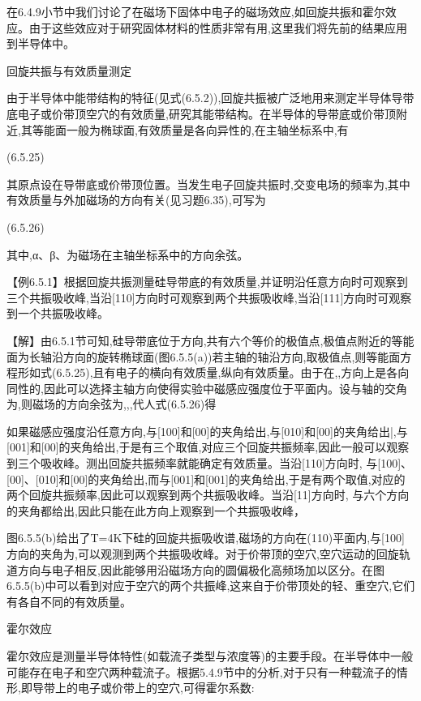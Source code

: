 在6.4.9小节中我们讨论了在磁场下固体中电子的磁场效应,如回旋共振和霍尔效应。由于这些效应对于研究固体材料的性质非常有用,这里我们将先前的结果应用到半导体中。

回旋共振与有效质量测定

由于半导体中能带结构的特征(见式(6.5.2)),回旋共振被广泛地用来测定半导体导带底电子或价带顶空穴的有效质量,研究其能带结构。在半导体的导带底或价带顶附近,其等能面一般为椭球面,有效质量是各向异性的,在主轴坐标系中,有

 	(6.5.25)

其原点设在导带底或价带顶位置。当发生电子回旋共振时,交变电场的频率为,其中有效质量与外加磁场的方向有关(见习题6.35),可写为

	 (6.5.26)

其中,α、β、为磁场在主轴坐标系中的方向余弦。

【例6.5.1】根据回旋共振测量硅导带底的有效质量,并证明沿任意方向时可观察到三个共振吸收峰,当沿[110]方向时可观察到两个共振吸收峰,当沿[111]方向时可观察到一个共振吸收峰。

【解】由6.5.1节可知,硅导带底位于方向,共有六个等价的极值点,极值点附近的等能面为长轴沿方向的旋转椭球面(图6.5.5(a))若主轴的轴沿方向,取极值点,则等能面方程形如式(6.5.25),且有电子的横向有效质量,纵向有效质量。由于在,,方向上是各向同性的,因此可以选择主轴方向使得实验中磁感应强度位于平面内。设与轴的交角为,则磁场的方向余弦为,,,代人式(6.5.26)得



如果磁感应强度沿任意方向,与[100]和[00]的夹角给出,与[010]和[00]的夹角给出|,与[001]和[00]的夹角给出,于是有三个取值,对应三个回旋共振频率,因此一般可以观察到三个吸收峰。测出回旋共振频率就能确定有效质量。当沿[110]方向时, 与[100]、[00]、[010]和[00]的夹角给出,而与[001]和[001]的夹角给出,于是有两个取值,对应的两个回旋共振频率,因此可以观察到两个共振吸收峰。当沿[11]方向时, 与六个方向的夹角都给出,因此只能在此方向上观察到一个共振吸收峰，



图6.5.5(b)给出了T=4K下硅的回旋共振吸收谱,磁场的方向在(110)平面内,与[100]方向的夹角为,可以观测到两个共振吸收峰。对于价带顶的空穴,空穴运动的回旋轨道方向与电子相反,因此能够用沿磁场方向的圆偏极化高频场加以区分。在图6.5.5(b)中可以看到对应于空穴的两个共振峰,这来自于价带顶处的轻、重空穴,它们有各自不同的有效质量。

霍尔效应

霍尔效应是测量半导体特性(如载流子类型与浓度等)的主要手段。在半导体中一般可能存在电子和空穴两种载流子。根据5.4.9节中的分析,对于只有一种载流子的情形,即导带上的电子或价带上的空穴,可得霍尔系数:


